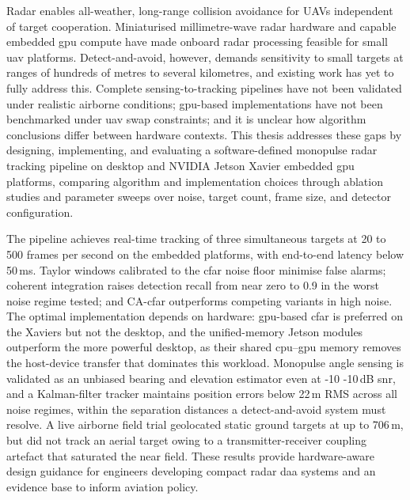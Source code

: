 Radar enables all-weather, long-range collision avoidance for UAVs independent of target cooperation. Miniaturised millimetre-wave radar hardware and capable embedded \gls{gpu} compute have made onboard radar processing feasible for small \gls{uav} platforms. Detect-and-avoid, however, demands sensitivity to small targets at ranges of hundreds of metres to several kilometres, and existing work has yet to fully address this. Complete sensing-to-tracking pipelines have not been validated under realistic airborne conditions; \gls{gpu}-based implementations have not been benchmarked under \gls{uav} \gls{swap} constraints; and it is unclear how algorithm conclusions differ between hardware contexts. This thesis addresses these gaps by designing, implementing, and evaluating a software-defined monopulse radar tracking pipeline on desktop and NVIDIA Jetson Xavier embedded \gls{gpu} platforms, comparing algorithm and implementation choices through ablation studies and parameter sweeps over noise, target count, frame size, and detector configuration.

The pipeline achieves real-time tracking of three simultaneous targets at 20 to 500 frames per second on the embedded platforms, with end-to-end latency below 50\,ms. Taylor windows calibrated to the \gls{cfar} noise floor minimise false alarms; coherent integration raises detection recall from near zero to 0.9 in the worst noise regime tested; and CA-\gls{cfar} outperforms competing variants in high noise. The optimal implementation depends on hardware: \gls{gpu}-based \gls{cfar} is preferred on the Xaviers but not the desktop, and the unified-memory Jetson modules outperform the more powerful desktop, as their shared \gls{cpu}--\gls{gpu} memory removes the host-device transfer that dominates this workload. Monopulse angle sensing is validated as an unbiased bearing and elevation estimator even at 
-10
-10\,dB \gls{snr}, and a Kalman-filter tracker maintains position errors below 22\,m RMS across all noise regimes, within the separation distances a detect-and-avoid system must resolve. A live airborne field trial geolocated static ground targets at up to 706\,m, but did not track an aerial target owing to a transmitter-receiver coupling artefact that saturated the near field. These results provide hardware-aware design guidance for engineers developing compact radar \gls{daa} systems and an evidence base to inform aviation policy.